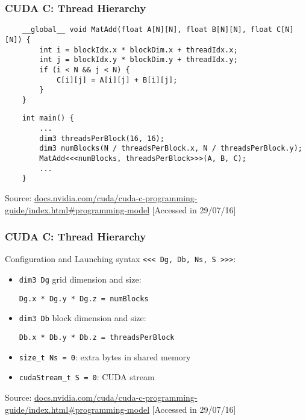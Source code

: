 \documentclass[10pt, compress]{beamer}
\begin{document}
\begin{frame}[fragile]
    \frametitle{CUDA C: Thread Hierarchy}
    \begin{lstlisting}
    __global__ void MatAdd(float A[N][N], float B[N][N], float C[N][N]) {
        int i = blockIdx.x * blockDim.x + threadIdx.x;
        int j = blockIdx.y * blockDim.y + threadIdx.y;
        if (i < N && j < N) {
            C[i][j] = A[i][j] + B[i][j];
        }
    }
    \end{lstlisting}
    \pause
    \begin{lstlisting}
    int main() {
        ...
        dim3 threadsPerBlock(16, 16);
        dim3 numBlocks(N / threadsPerBlock.x, N / threadsPerBlock.y);
        MatAdd<<<numBlocks, threadsPerBlock>>>(A, B, C);
        ...
    }
    \end{lstlisting}
    \vfill

    \begin{center}
        \tiny{Source: \url{docs.nvidia.com/cuda/cuda-c-programming-guide/index.html\#programming-model} [Accessed in 29/07/16]}
    \end{center}
\end{frame}

\begin{frame}[fragile]
    \frametitle{CUDA C: Thread Hierarchy}
    Configuration and Launching syntax \texttt{\scriptsize{\alert{<<<} Dg, Db, Ns, S \alert{>>>}}}:
    \begin{itemize}
        \item \texttt{\alert{dim3} Dg} grid dimension and size:
\begin{lstlisting}
Dg.x * Dg.y * Dg.z = numBlocks
\end{lstlisting}
        \pause
        \item \texttt{\alert{dim3} Db} block dimension and size:
\begin{lstlisting}
Db.x * Db.y * Db.z = threadsPerBlock
\end{lstlisting}
        \pause
        \item \texttt{\alert{size\_t} Ns = 0}: extra bytes in shared memory
        \item \texttt{\alert{cudaStream\_t} S = 0}: CUDA stream
    \end{itemize}

    \vfill

    \begin{center}
        \tiny{Source: \url{docs.nvidia.com/cuda/cuda-c-programming-guide/index.html\#programming-model} [Accessed in 29/07/16]}
    \end{center}
\end{frame}
\end{document}
